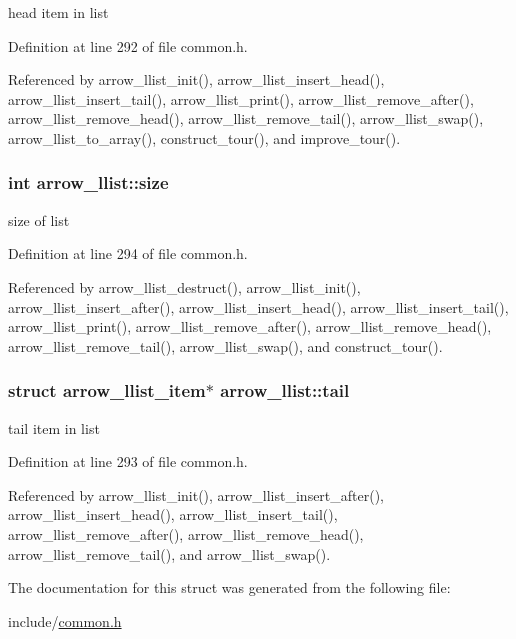 head item in list 

Definition at line 292 of file common.h.

Referenced by arrow\_\-llist\_\-init(), arrow\_\-llist\_\-insert\_\-head(), arrow\_\-llist\_\-insert\_\-tail(), arrow\_\-llist\_\-print(), arrow\_\-llist\_\-remove\_\-after(), arrow\_\-llist\_\-remove\_\-head(), arrow\_\-llist\_\-remove\_\-tail(), arrow\_\-llist\_\-swap(), arrow\_\-llist\_\-to\_\-array(), construct\_\-tour(), and improve\_\-tour().\hypertarget{structarrow__llist_89bdc72883d1d24717445c8087b6b0dc}{
\subsubsection[{size}]{\setlength{\rightskip}{0pt plus 5cm}int {\bf arrow\_\-llist::size}}}
\label{structarrow__llist_89bdc72883d1d24717445c8087b6b0dc}


size of list 

Definition at line 294 of file common.h.

Referenced by arrow\_\-llist\_\-destruct(), arrow\_\-llist\_\-init(), arrow\_\-llist\_\-insert\_\-after(), arrow\_\-llist\_\-insert\_\-head(), arrow\_\-llist\_\-insert\_\-tail(), arrow\_\-llist\_\-print(), arrow\_\-llist\_\-remove\_\-after(), arrow\_\-llist\_\-remove\_\-head(), arrow\_\-llist\_\-remove\_\-tail(), arrow\_\-llist\_\-swap(), and construct\_\-tour().\hypertarget{structarrow__llist_17aad561a27cd835fef598e8ffd135c8}{
\subsubsection[{tail}]{\setlength{\rightskip}{0pt plus 5cm}struct {\bf arrow\_\-llist\_\-item}$\ast$ {\bf arrow\_\-llist::tail}}}
\label{structarrow__llist_17aad561a27cd835fef598e8ffd135c8}


tail item in list 

Definition at line 293 of file common.h.

Referenced by arrow\_\-llist\_\-init(), arrow\_\-llist\_\-insert\_\-after(), arrow\_\-llist\_\-insert\_\-head(), arrow\_\-llist\_\-insert\_\-tail(), arrow\_\-llist\_\-remove\_\-after(), arrow\_\-llist\_\-remove\_\-head(), arrow\_\-llist\_\-remove\_\-tail(), and arrow\_\-llist\_\-swap().

The documentation for this struct was generated from the following file:\begin{CompactItemize}
\item 
include/\hyperlink{common_8h}{common.h}\end{CompactItemize}
